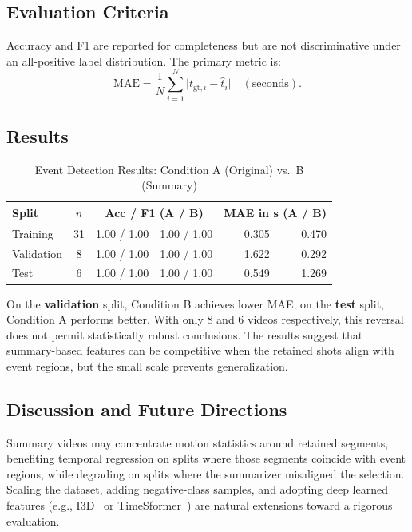 \documentclass[10pt,conference]{IEEEtran}
\begin{document}
\subsection{Evaluation Criteria}

Accuracy and F1 are reported for completeness but are not discriminative
under an all-positive label distribution. The primary metric is:
\begin{equation}
  \mathrm{MAE} = \frac{1}{N}\sum_{i=1}^{N}
    \bigl|t_{\mathrm{gt},i} - \hat{t}_i\bigr| \quad (\text{seconds}).
\end{equation}

\subsection{Results}

\begin{table}[H]
\centering
\caption{Event Detection Results: Condition A (Original) vs.\ B (Summary)}
\label{tab:event_results}
\begin{tabular}{lcrrrr}
\toprule
\textbf{Split} & \textbf{$n$} &
  \multicolumn{2}{c}{\textbf{Acc / F1 (A / B)}} &
  \multicolumn{2}{c}{\textbf{MAE in s (A / B)}} \\
\midrule
Training   & 31 & 1.00 / 1.00 & 1.00 / 1.00 & 0.305 & 0.470 \\
Validation & 8  & 1.00 / 1.00 & 1.00 / 1.00 & 1.622 & 0.292 \\
Test       & 6  & 1.00 / 1.00 & 1.00 / 1.00 & 0.549 & 1.269 \\
\bottomrule
\end{tabular}
\end{table}

On the \textbf{validation} split, Condition B achieves lower MAE; on the
\textbf{test} split, Condition A performs better. With only 8 and 6 videos
respectively, this reversal does not permit statistically robust conclusions.
The results suggest that summary-based features can be competitive when the
retained shots align with event regions, but the small scale prevents
generalization.

\subsection{Discussion and Future Directions}

Summary videos may concentrate motion statistics around retained segments,
benefiting temporal regression on splits where those segments coincide with
event regions, while degrading on splits where the summarizer misaligned the
selection. Scaling the dataset, adding negative-class samples, and adopting
deep learned features (e.g., I3D~\cite{carreira2017} or
TimeSformer~\cite{bertasius2021}) are natural extensions toward a rigorous
evaluation.
\end{document}
